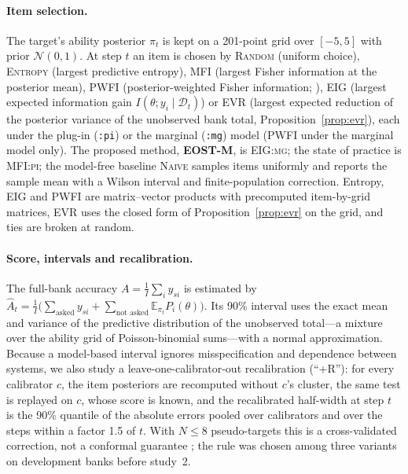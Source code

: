 \paragraph{Item selection.} The target's ability posterior $\pi_t$ is kept on a 201-point
grid over $[-5,5]$ with prior $\mathcal N(0,1)$. At step $t$ an item is chosen by
\textsc{Random} (uniform choice), \textsc{Entropy} (largest predictive entropy),
\textsc{MFI} (largest Fisher information at the posterior mean), \textsc{PWFI}
(posterior-weighted Fisher information; \citealp{vanderlinden1998bayesian}), \textsc{EIG}
(largest expected information gain $I(\theta;y_i\mid\mathcal D_t)$) or \textsc{EVR}
(largest expected reduction of the posterior variance of the unobserved bank total,
Proposition~\ref{prop:evr}), each under the plug-in (\texttt{:pi}) or the marginal
(\texttt{:mg}) model (PWFI under the marginal model only). The proposed method,
\textbf{EOST-M}, is \textsc{EIG:mg}; the state of practice is \textsc{MFI:pi}; the
model-free baseline \textsc{Naive} samples items uniformly and reports the sample mean with
a Wilson interval and finite-population correction. Entropy, EIG and PWFI are matrix--vector
products with precomputed item-by-grid matrices, EVR uses the closed form of
Proposition~\ref{prop:evr} on the grid, and ties are broken at random.

\paragraph{Score, intervals and recalibration.} The full-bank accuracy
$A=\frac1I\sum_iy_{si}$ is estimated by
$\hat A_t=\frac1I\big(\sum_{\text{asked}}y_{si}+\sum_{\text{not asked}}\mathbb E_{\pi_t}P_i(\theta)\big)$.
Its 90\% interval uses the exact mean and variance of the predictive distribution of the
unobserved total---a mixture over the ability grid of Poisson-binomial sums---with a normal
approximation. Because a model-based interval ignores misspecification and dependence
between systems, we also study a leave-one-calibrator-out recalibration (``+R''): for every
calibrator $c$, the item posteriors are recomputed without $c$'s cluster, the same test is
replayed on $c$, whose score is known, and the recalibrated half-width at step $t$ is the
90\% quantile of the absolute errors pooled over calibrators and over the steps within a
factor 1.5 of $t$. With $N\le8$ pseudo-targets this is a cross-validated correction, not a
conformal guarantee \citep{vovk2005algorithmic}; the rule was chosen among three variants on
development banks before study~2.

